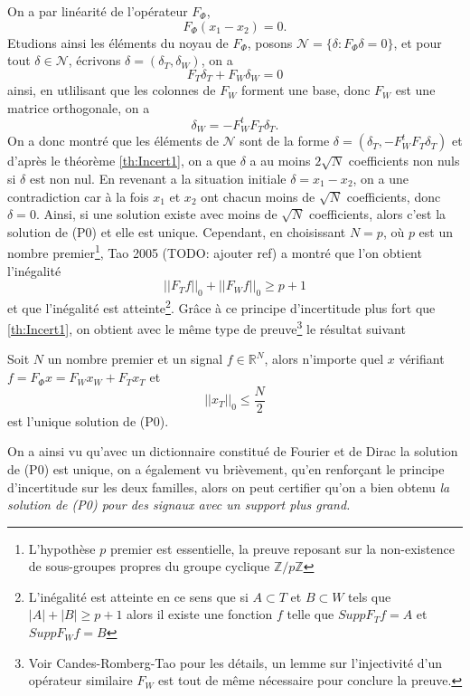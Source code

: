 \begin{exemple}
	On a par linéarité de l'opérateur $F_\Phi$, 
	\begin{equation}
		F_\Phi( x_1 - x_2) = 0.
	\end{equation}
	Etudions ainsi les éléments du noyau de $F_\Phi$, posons $\mathcal{N} = \{\delta : F_\Phi \delta = 0\}$, et pour tout $\delta \in \mathcal{N}$, écrivons $\delta = (\delta_T, \delta_W)$, on a
	\begin{equation}
		F_T \delta_T + F_W \delta_W = 0
	\end{equation}
	ainsi, en utlilisant que les colonnes de $F_W$ forment une base, donc $F_W$ est une matrice orthogonale, on a 
	\begin{equation}\label{eq:structN}
		\delta_W = -F_W^t F_T \delta_T .
	\end{equation}
	On a donc montré que les éléments de $\mathcal{N}$ sont de la forme $\delta = (\delta_T, -F_W^t F_T \delta_T)$ et d'après le théorème \ref{th:Incert1}, on a que $\delta$ a au moins $2\sqrt{N}$ coefficients non nuls si $\delta$ est non nul. 
	En revenant a la situation initiale $\delta = x_1 - x_2$, on a une contradiction car à la fois $x_1$ et $x_2$ ont chacun moins de $\sqrt{N}$ coefficients, donc $\delta = 0$.
	Ainsi, si une solution existe avec moins de $\sqrt{N}$ coefficients, alors c'est la solution de (P0) et elle est unique.
	\newline
	Cependant, en choisissant $N = p$, où $p$ est un nombre premier\footnote{L'hypothèse $p$ premier est essentielle, la preuve reposant sur la non-existence de sous-groupes propres du groupe cyclique $\mathbb{Z}/p\mathbb{Z}$}, Tao 2005 (TODO: ajouter ref) a montré que l'on obtient l'inégalité
	\begin{equation}
		||F_T f||_0 + ||F_W f||_0 \geq p + 1
	\end{equation}
	et que l'inégalité est atteinte\footnote{L'inégalité est atteinte en ce sens que si $A\subset T$ et $B\subset W$ tels que $|A| + |B| \geq p+1$ alors il existe une fonction $f$ telle que $Supp F_T f = A$ et $Supp F_W f = B$}.
	Grâce à ce principe d'incertitude plus fort que \ref{th:Incert1}, on obtient avec le même type de preuve\footnote{Voir Candes-Romberg-Tao pour les détails, un lemme sur l'injectivité d'un opérateur similaire $F_W$ est tout de même nécessaire pour conclure la preuve.} le résultat suivant
	\begin{theoreme}
		Soit $N$ un nombre premier et un signal $f \in \mathbb{R}^N$, alors n'importe quel $x$ vérifiant $f = F_\Phi x = F_W x_W + F_T x_T$ et
		\begin{equation}\label{eq:Incert2}
		||x_T||_0 \leq \frac{N}{2}
		\end{equation}
		est l'unique solution de (P0).
	\end{theoreme}
	On a ainsi vu qu'avec un dictionnaire constitué de Fourier et de Dirac la solution de (P0) est unique, on a également vu brièvement, qu'en renforçant le principe d'incertitude sur les deux familles, alors on peut certifier qu'on a bien obtenu \it{la} solution de (P0) pour des signaux avec un support plus grand.
\end{exemple}
